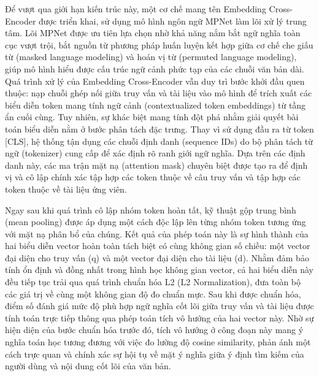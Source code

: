 Để vượt qua giới hạn kiến trúc này, một cơ chế mang tên Embedding Cross-Encoder được triển khai, sử dụng mô hình ngôn ngữ MPNet làm lõi xử lý trung tâm. Lõi MPNet được ưu tiên lựa chọn nhờ khả năng nắm bắt ngữ nghĩa toàn cục vượt trội, bắt nguồn từ phương pháp huấn luyện kết hợp giữa cơ chế che giấu từ (masked language modeling) và hoán vị từ (permuted language modeling), giúp mô hình hiểu được cấu trúc ngữ cảnh phức tạp của các chuỗi văn bản dài. Quá trình xử lý của Embedding Cross-Encoder vẫn duy trì bước khởi đầu quen thuộc: nạp chuỗi ghép nối giữa truy vấn và tài liệu vào mô hình để trích xuất các biểu diễn token mang tính ngữ cảnh (contextualized token embeddings) từ tầng ẩn cuối cùng. Tuy nhiên, sự khác biệt mang tính đột phá nhằm giải quyết bài toán biểu diễn nằm ở bước phân tách đặc trưng. Thay vì sử dụng đầu ra từ token [CLS], hệ thống tận dụng các chuỗi định danh (sequence IDs) do bộ phân tách từ ngữ (tokenizer) cung cấp để xác định rõ ranh giới ngữ nghĩa. Dựa trên các định danh này, các ma trận mặt nạ (attention mask) chuyên biệt được tạo ra để định vị và cô lập chính xác tập hợp các token thuộc về câu truy vấn và tập hợp các token thuộc về tài liệu ứng viên. 

Ngay sau khi quá trình cô lập nhóm token hoàn tất, kỹ thuật gộp trung bình (mean pooling) được áp dụng một cách độc lập lên từng nhóm token tương ứng với mặt nạ phân bổ của chúng. Kết quả của phép toán này là sự hình thành của hai biểu diễn vector hoàn toàn tách biệt có cùng không gian số chiều: một vector đại diện cho truy vấn (q) và một vector đại diện cho tài liệu (d). Nhằm đảm bảo tính ổn định và đồng nhất trong hình học không gian vector, cả hai biểu diễn này đều tiếp tục trải qua quá trình chuẩn hóa L2 (L2 Normalization), đưa toàn bộ các giá trị về cùng một không gian độ đo chuẩn mực. Sau khi được chuẩn hóa, điểm số đánh giá mức độ phù hợp ngữ nghĩa cốt lõi giữa truy vấn và tài liệu được tính toán trực tiếp thông qua phép toán tích vô hướng của hai vector này. Nhờ sự hiện diện của bước chuẩn hóa trước đó, tích vô hướng ở công đoạn này mang ý nghĩa toán học tương đương với việc đo lường độ cosine similarity, phản ánh một cách trực quan và chính xác sự hội tụ về mặt ý nghĩa giữa ý định tìm kiếm của người dùng và nội dung cốt lõi của văn bản.

